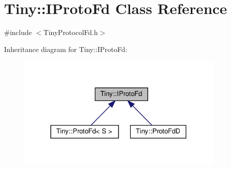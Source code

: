 \hypertarget{classTiny_1_1IProtoFd}{}\section{Tiny\+:\+:I\+Proto\+Fd Class Reference}
\label{classTiny_1_1IProtoFd}


{\ttfamily \#include $<$Tiny\+Protocol\+Fd.\+h$>$}



Inheritance diagram for Tiny\+:\+:I\+Proto\+Fd\+:\nopagebreak
\begin{figure}[H]
\begin{center}
\leavevmode
\includegraphics[width=282pt]{classTiny_1_1IProtoFd__inherit__graph}
\end{center}
\end{figure}
